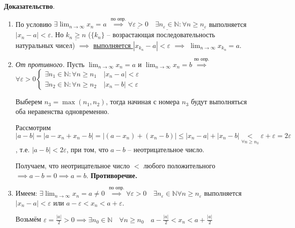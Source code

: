 \documentclass{article}
\newcommand{\bydef}{\stackrel{\text{по опр.}}{\implies}} %
\newcommand{\dslim}{\displaystyle\lim}
\newcommand{\dslimn}{\dslim_{n \to \infty}}
\begin{document}
\textbf{Доказательство}.

\begin{enumerate}
    \item По условию $\exists \dslimn x_n = a$
    $\bydef \underline{\forall \varepsilon > 0}
    \quad \underline{\exists n_\varepsilon \in \mathbb{N}}: 
    \forall n \ge \underline{n_\varepsilon}$ выполняется 
    $\left| x_n - a \right| < \varepsilon$. Но $\underline{k_n \ge n}$
    ($\{k_n\}$ -- возрастающая последовательность натуральных чисел)
    $\implies$ \underline{выполняется $\left| x_{k_n} - a \right| < \varepsilon$}
    $\implies$ $\dslimn x_{k_n} = a$.

    \item \textit{От противного.} Пусть $\dslimn x_n = a$ и
    $\dslimn x_n = b \bydef$
    $\forall \varepsilon > 0 \begin{cases}
        \exists n_1 \in \mathbb{N}: \forall n \ge n_1 \quad \left| x_n - a \right| < \varepsilon \\
        \exists n_2 \in \mathbb{N}: \forall n \ge n_2 \quad \left| x_n - b \right| < \varepsilon
    \end{cases}$

    Выберем $n_3 = \max \left( n_1, n_2 \right)$, тогда начиная с номера $n_3$ будут выполняться оба
    неравенства одновременно.

    Рассмотрим $\left| a - b \right| = \left| a - x_n + x_n - b \right| = 
    \left| (a - x_n) + (x_n - b) \right| \le \left| x_n - a \right| + 
    \left| x_n - b \right| \underset{\forall n \ge n_3}{<}
    \varepsilon + \varepsilon = 2 \varepsilon$, т.е. $\left| a - b \right| < 2 \varepsilon$,
    при том, что $a - b$ -- неотрицательное число.

    Получаем, что неотрицательное число $<$ любого положительного 
    $\implies a - b = 0 \implies a = b$. \textbf{Противоречие.}

    \item Имеем: $\exists \dslimn x_n = a \ne 0$
    $\bydef \forall \varepsilon > 0 \quad \exists n_\varepsilon \in \mathbb{N} 
    \forall n \ge n_\varepsilon$ выполняется $\left| x_n - a \right| < \varepsilon$
    или $a - \varepsilon < x_n < a + \varepsilon$.
    
    Возьмём $\varepsilon = \frac{\left| a \right|}{2} > 0 \implies 
    \exists n_0 \in \mathbb{N} \quad \forall n \ge n_0 \quad
    a - \frac{\left| a \right|}{2} < x_n < a + \frac{\left| a \right|}{2}$


\end{enumerate}
\end{document}
